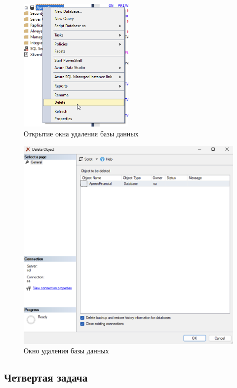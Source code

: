 \documentclass[a4paper, 14pt]{extarticle}
\begin{document}
\begin{figure}[H]
  \centering
  \includegraphics[width=0.5\textwidth]{images/task-3/step-1.png}
  \caption{Открытие окна удаления базы данных}
  \label{fig:task-3/step-1.png}
\end{figure}

\begin{figure}[H]
  \centering
  \includegraphics[width=\textwidth]{images/task-3/step-2.png}
  \caption{Окно удаления базы данных}
  \label{fig:task-3/step-2.png}
\end{figure}

\subsection{Четвертая задача}
\end{document}
